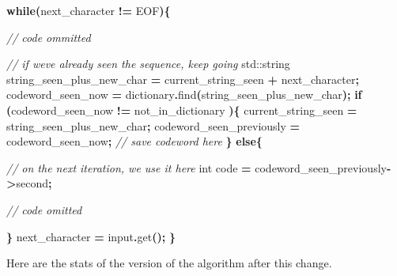 \documentclass[12pt,twoside]{reedthesis}
\newenvironment{Shaded}{\begin{snugshade}}{\end{snugshade}}
\newcommand{\BuiltInTok}[1]{#1}
\newcommand{\CommentTok}[1]{\textcolor[rgb]{0.56,0.35,0.01}{\textit{#1}}}
\newcommand{\ControlFlowTok}[1]{\textcolor[rgb]{0.13,0.29,0.53}{\textbf{#1}}}
\newcommand{\DataTypeTok}[1]{\textcolor[rgb]{0.13,0.29,0.53}{#1}}
\newcommand{\NormalTok}[1]{#1}
\newcommand{\OperatorTok}[1]{\textcolor[rgb]{0.81,0.36,0.00}{\textbf{#1}}}
\begin{document}
\begin{Shaded}
\begin{Highlighting}[]

\ControlFlowTok{while}\OperatorTok{(}\NormalTok{next\_character }\OperatorTok{!=}\NormalTok{ EOF}\OperatorTok{)\{}

    \CommentTok{// code ommitted}

    \CommentTok{// if we\textquotesingle{}ve already seen the sequence, keep going}
    \BuiltInTok{std::}\NormalTok{string}\OperatorTok{ }\NormalTok{string\_seen\_plus\_new\_char }\OperatorTok{=}\NormalTok{ current\_string\_seen }\OperatorTok{+}\NormalTok{ next\_character}\OperatorTok{;}
\NormalTok{    codeword\_seen\_now }\OperatorTok{=}\NormalTok{ dictionary}\OperatorTok{.}\NormalTok{find}\OperatorTok{(}\NormalTok{string\_seen\_plus\_new\_char}\OperatorTok{);}
    \ControlFlowTok{if} \OperatorTok{(}\NormalTok{codeword\_seen\_now }\OperatorTok{!=}\NormalTok{ not\_in\_dictionary }\OperatorTok{)\{}
\NormalTok{        current\_string\_seen }\OperatorTok{=}\NormalTok{ string\_seen\_plus\_new\_char}\OperatorTok{;}
\NormalTok{        codeword\_seen\_previously }\OperatorTok{=}\NormalTok{ codeword\_seen\_now}\OperatorTok{;} \CommentTok{// save codeword here}
    \OperatorTok{\}}
    \ControlFlowTok{else}\OperatorTok{\{}

        \CommentTok{// on the next iteration, we use it here}
        \DataTypeTok{int}\NormalTok{ code }\OperatorTok{=}\NormalTok{ codeword\_seen\_previously}\OperatorTok{{-}\textgreater{}}\NormalTok{second}\OperatorTok{;}

        \CommentTok{// code omitted}

    \OperatorTok{\}}
\NormalTok{    next\_character }\OperatorTok{=}\NormalTok{ input}\OperatorTok{.}\NormalTok{get}\OperatorTok{();}
\OperatorTok{\}}
\end{Highlighting}
\end{Shaded}
Here are the stats of the version of the algorithm after this change.
\end{document}

